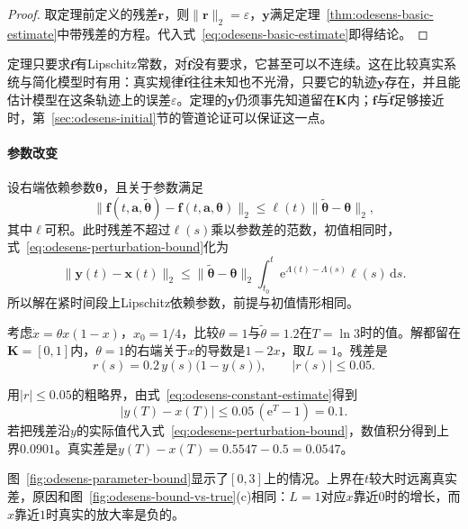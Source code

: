 \begin{proof}
取定理前定义的残差$\bm{r}$，则$\lVert\bm{r}\rVert_2=\varepsilon$，$\bm{y}$满足定理~\ref{thm:odesens-basic-estimate}中带残差的方程。代入式~\eqref{eq:odesens-basic-estimate}即得结论。
\end{proof}

定理只要求$\bm{f}$有Lipschitz常数，对$\tilde{\bm{f}}$没有要求，它甚至可以不连续。这在比较真实系统与简化模型时有用：真实规律$\tilde{\bm{f}}$往往未知也不光滑，只要它的轨迹$\bm{y}$存在，并且能估计模型在这条轨迹上的误差$\varepsilon$。定理的$\bm{y}$仍须事先知道留在$\bm{K}$内；$\bm{f}$与$\tilde{\bm{f}}$足够接近时，第~\ref{sec:odesens-initial}节的管道论证可以保证这一点。

\paragraph{参数改变}
设右端依赖参数$\bm{\theta}$，且关于参数满足
\[
 \lVert\bm{f}(t,\bm{a},\tilde{\bm{\theta}})-\bm{f}(t,\bm{a},\bm{\theta})\rVert_2\leq\ell(t)\lVert\tilde{\bm{\theta}}-\bm{\theta}\rVert_2,
\]
其中$\ell$可积。此时残差不超过$\ell(s)$乘以参数差的范数，初值相同时，式~\eqref{eq:odesens-perturbation-bound}化为
\begin{equation}
 \lVert\bm{y}(t)-\bm{x}(t)\rVert_2\leq\lVert\tilde{\bm{\theta}}-\bm{\theta}\rVert_2\int_{t_0}^{t}\mathrm{e}^{\Lambda(t)-\Lambda(s)}\ell(s)\,\mathrm{d}s.
 \label{eq:odesens-parameter-bound}
\end{equation}
所以解在紧时间段上Lipschitz依赖参数，前提与初值情形相同。

\begin{example}[增长率改变$20\%$]
\label{ex:odesens-parameter-bound}
考虑$\dot{x}=\theta x(1-x)$，$x_0=1/4$，比较$\theta=1$与$\tilde{\theta}=1.2$在$T=\ln3$时的值。解都留在$\bm{K}=[0,1]$内，$\theta=1$的右端关于$x$的导数是$1-2x$，取$L=1$。残差是
\[
 r(s)=0.2\,y(s)\bigl(1-y(s)\bigr),\qquad \lvert r(s)\rvert\leq0.05.
\]

用$\lvert r\rvert\leq0.05$的粗略界，由式~\eqref{eq:odesens-constant-estimate}得到
\[
 \lvert y(T)-x(T)\rvert\leq0.05\,(\mathrm{e}^{T}-1)=0.1.
\]
若把残差沿$y$的实际值代入式~\eqref{eq:odesens-perturbation-bound}，数值积分得到上界$0.0901$。真实差是$y(T)-x(T)=0.5547-0.5=0.0547$。
\end{example}

图~\ref{fig:odesens-parameter-bound}显示了$[0,3]$上的情况。上界在$t$较大时远离真实差，原因和图~\ref{fig:odesens-bound-vs-true}(c)相同：$L=1$对应$x$靠近$0$时的增长，而$x$靠近$1$时真实的放大率是负的。

